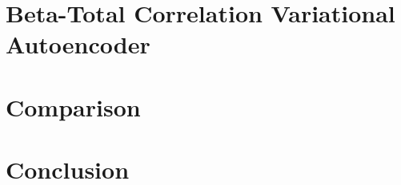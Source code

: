 \documentclass[a4paper]{IEEEtran}
\begin{document}
\section{Beta-Total Correlation Variational Autoencoder}


\section{Comparison}
\section{Conclusion}



\end{document}
